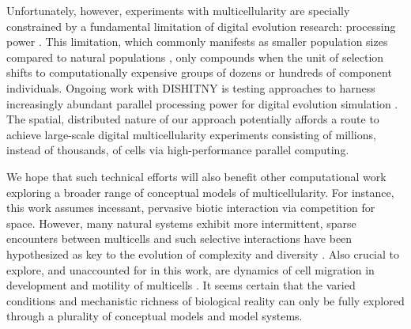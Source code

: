 Unfortunately, however, experiments with multicellularity are specially constrained by a fundamental limitation of digital evolution research: processing power \citep{Moreno_2020}.
This limitation, which commonly manifests as smaller population sizes compared to natural populations \citep{liard2018complexity}, only compounds when the unit of selection shifts to computationally expensive groups of dozens or hundreds of component individuals.
Ongoing work with DISHITNY is testing approaches to harness increasingly abundant parallel processing power for digital evolution simulation \citep{moreno2021conduit}.
The spatial, distributed nature of our approach potentially affords a route to achieve large-scale digital multicellularity experiments consisting of millions, instead of thousands, of cells via high-performance parallel computing.

We hope that such technical efforts will also benefit other computational work exploring a broader range of conceptual models of multicellularity.
For instance, this work assumes incessant, pervasive biotic interaction via competition for space.
However, many natural systems exhibit more intermittent, sparse encounters between multicells and such selective interactions have been hypothesized as key to the evolution of complexity and diversity \citep{soros2014identifying}.
Also crucial to explore, and unaccounted for in this work, are dynamics of cell migration in development \citep{horwitz2003cell} and motility of multicells \citep{arnellos2019bodily}.
It seems certain that the varied conditions and mechanistic richness of biological reality can only be fully explored through a plurality of conceptual models and model systems.
